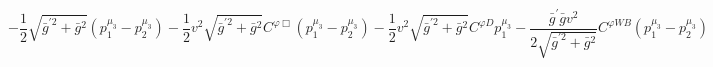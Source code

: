 %
\begin{dmath*}
%
  -  \frac{1}{2} \sqrt{{\bar g}^{\prime 2} + {\bar g}{}^2} \left(p_1^{\mu_3} - p_2^{\mu_3}\right)  -  \frac{1}{2} v^2 \sqrt{{\bar g}^{\prime 2} + {\bar g}{}^2}C^{ \varphi  \Box} \left(p_1^{\mu_3} - p_2^{\mu_3}\right)  -  \frac{1}{2} v^2 \sqrt{{\bar g}^{\prime 2} + {\bar g}{}^2}C^{ \varphi  D} p_1^{\mu_3}  -  \frac{{\bar g}^\prime {\bar g}{} v^2}{2 \sqrt{{\bar g}^{\prime 2} + {\bar g}{}^2}}C^{ \varphi  WB} \left(p_1^{\mu_3} - p_2^{\mu_3}\right)
%
\end{dmath*}
%
